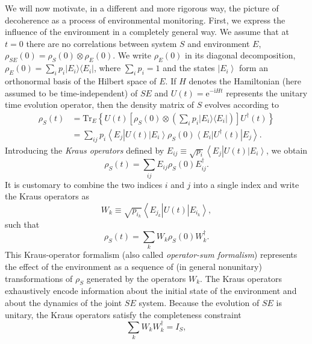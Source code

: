 \documentclass[aps,pra,reprint,amsmath,amssymb,showpacs,nofootinbib,floatfix,onecolumn,12pt]{revtex4-1}
\newcommand{\bra}[1]{\left\langle{#1}\right\vert}
\newcommand{\ket}[1]{\left\vert{#1}\right\rangle}
\newcommand{\ketbra}[2]{\ensuremath{|{#1 \rangle}{\langle #2}|}}
\newcommand{\E}{\text{e}}
\newcommand{\I}{\text{i}}
\begin{document}
We will now motivate, in a different and more rigorous way, the picture of decoherence as a process of environmental monitoring. First, we express the influence of the environment in a completely general way. We assume that at $t=0$ there are no correlations between system $S$ and environment $E$, $\rho_{SE}(0) = \rho_S(0) \otimes \rho_E(0)$. We write $\rho_E(0)$ in its diagonal decomposition, $\rho_E(0) = \sum_i p_i \ketbra{E_i}{E_i}$, where $\sum_i p_i =1$ and the states $\ket{E_i}$ form an orthonormal basis of the Hilbert space of $E$. If $H$ denotes the Hamiltonian (here assumed to be time-independent) of $SE$ and $U(t) = \E^{-\I H t}$ represents the unitary time evolution operator, then the density matrix of $S$ evolves according to 
%
\begin{align}
  \label{eq:1slvjhvkjfkjvsj0}
  \rho_S(t) &= \text{Tr}_E \left\{ U(t) \left[ \rho_S(0) \otimes \left( \sum_i p_i \ketbra{E_i}{E_i} \right) \right] U^\dagger(t) \right\}\nonumber \\
&= \sum_{ij} p_i \bra{E_j} U(t) \ket{E_i} \rho_S(0)\bra{E_i} U^\dagger(t) \ket{E_j}.
\end{align}
%
Introducing the \emph{Kraus operators} \cite{Kraus:1983:ee} defined by $E_{ij} \equiv \sqrt{p_i} \bra{E_j} U(t) \ket{E_i}$, we obtain
%
\begin{equation}
 \rho_S(t) = \sum_{ij} E_{ij} \rho_S(0) E^\dagger_{ij}.
\end{equation}
%
It is customary to combine the two indices $i$ and $j$ into a single index and write the Kraus operators as
%
\begin{equation}
  \label{eq:worihfvsjvttrafs2}
  W_k \equiv \sqrt{p_{i_k}} \bra{E_{j_k}} U(t) \ket{E_{i_k}},
\end{equation}
%
such that 
%
\begin{equation}
\label{eq:dfjsb1}
 \rho_S(t) = \sum_k W_k \rho_S(0) W^\dagger_k.
\end{equation}
%
This Kraus-operator formalism (also called \emph{operator-sum formalism}) represents the effect of the environment as a sequence of (in general nonunitary) transformations of $\rho_S$ generated by the operators $W_k$. The Kraus operators exhaustively encode information about the initial state of the environment and about the dynamics of the joint $SE$ system. Because the evolution of $SE$ is unitary, the Kraus operators satisfy the completeness constraint
%
\begin{equation}
  \label{eq:19sirhgvksjvbkjsb}
\sum_k W_k W^\dagger_k = I_S,
\end{equation}
\end{document}

